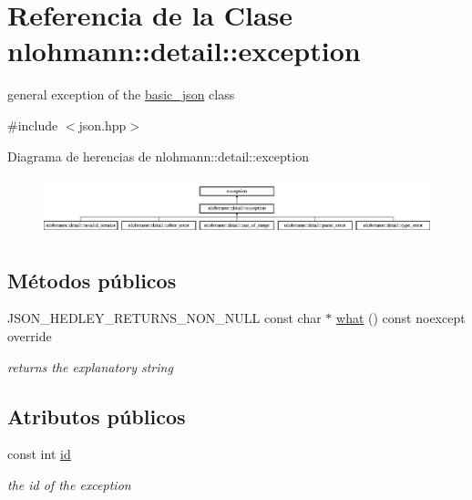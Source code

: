 \hypertarget{classnlohmann_1_1detail_1_1exception}{}\section{Referencia de la Clase nlohmann\+:\+:detail\+:\+:exception}
\label{classnlohmann_1_1detail_1_1exception}


general exception of the \mbox{\hyperlink{classnlohmann_1_1basic__json}{basic\+\_\+json}} class  




{\ttfamily \#include $<$json.\+hpp$>$}

Diagrama de herencias de nlohmann\+:\+:detail\+:\+:exception\begin{figure}[H]
\begin{center}
\leavevmode
\includegraphics[height=1.680000cm]{classnlohmann_1_1detail_1_1exception}
\end{center}
\end{figure}
\subsection*{Métodos públicos}
\begin{DoxyCompactItemize}
\item 
\mbox{\label{classnlohmann_1_1detail_1_1exception_a2ecff34cee144f843644a252a07cdadc}} 
J\+S\+O\+N\+\_\+\+H\+E\+D\+L\+E\+Y\+\_\+\+R\+E\+T\+U\+R\+N\+S\+\_\+\+N\+O\+N\+\_\+\+N\+U\+LL const char $\ast$ \mbox{\hyperlink{classnlohmann_1_1detail_1_1exception_a2ecff34cee144f843644a252a07cdadc}{what}} () const noexcept override
\begin{DoxyCompactList}\small\item\em returns the explanatory string \end{DoxyCompactList}\end{DoxyCompactItemize}
\subsection*{Atributos públicos}
\begin{DoxyCompactItemize}
\item 
\mbox{\label{classnlohmann_1_1detail_1_1exception_a0d4589a3fb54e81646d986c05efa3b9a}} 
const int \mbox{\hyperlink{classnlohmann_1_1detail_1_1exception_a0d4589a3fb54e81646d986c05efa3b9a}{id}}
\begin{DoxyCompactList}\small\item\em the id of the exception \end{DoxyCompactList}\end{DoxyCompactItemize}
